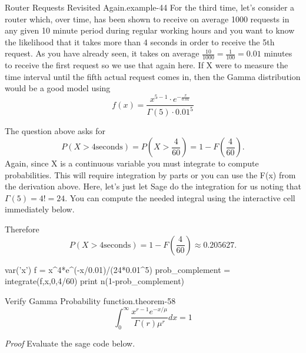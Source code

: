 \documentclass[10pt,]{book}
\makeatletter
\renewcommand*{\proofname}{Proof}
\renewenvironment{proof}[1][\proofname]{\par
  \pushQED{\qed}%
  \normalfont \topsep6\p@\@plus6\p@\relax
  \trivlist
  \item\relax
    {\itshape
    #1\@addpunct{.}}\hspace\labelsep\ignorespaces
}{%
  \popQED\endtrivlist\@endpefalse
}
\numberwithin{equation}{section}
\newcommand{\gt}{>}
\makeatother
\begin{document}
\begin{example}{Router Requests Revisited Again.}{example-44}%
\hypertarget{p-1135}{}%
For the third time, let's consider a router which, over time, has been shown to receive on average 1000 requests in any given 10 minute period during regular working hours and you want to know the likelihood that it takes more than 4 seconds in order to receive the 5th request. As you have already seen, it takes on average \(\frac{10}{1000} = \frac{1}{100} = 0.01\) minutes to receive the first request so we use that again here. If X were to measure the time interval until the fifth actual request comes in, then the Gamma distribution would be a good model using%
\begin{equation*}
f(x) =  \frac{x^{5-1} \cdot e^{- \frac{x}{0.01}}}{\Gamma(5) \cdot 0.01^5}
\end{equation*}
%
\par
\hypertarget{p-1136}{}%
The question above asks for%
\begin{equation*}
P(X \gt 4 \text{seconds}) = P(X \gt \frac{4}{60} ) = 1 - F(\frac{4}{60}).
\end{equation*}
Again, since X is a continuous variable you must integrate to compute probabilities. This will require integration by parts or you can use the F(x) from the derivation above. Here, let's just let Sage do the integration for us noting that \(\Gamma(5) = 4! = 24\). You can compute the needed integral using the interactive cell immediately below.%
\end{example}
%
\par
\hypertarget{p-1137}{}%
Therefore%
\begin{equation*}
P(X \gt 4 \text{seconds}) = 1 - F(\frac{4}{60}) \approx 0.205627.
\end{equation*}
%
\par
\hypertarget{p-1138}{}%
\leavevmode%
\begin{sageinput}
var('x')
f = x^4*e^(-x/0.01)/(24*0.01^5)
prob_complement = integrate(f,x,0,4/60)
print n(1-prob_complement)
\end{sageinput}
%
\par
\hypertarget{p-1139}{}%
\begin{theorem}{Verify Gamma Probability function.}{}{theorem-58}%
\hypertarget{p-1140}{}%
%
\begin{equation*}
\int_0^{\infty} \frac{x^{r-1} e^{-x/ \mu}}{\Gamma(r) \mu^r} dx = 1
\end{equation*}
%
\end{theorem}
\begin{proof}\hypertarget{proof-60}{}
\hypertarget{p-1141}{}%
Evaluate the sage code below.%
\end{proof}
\end{document}
